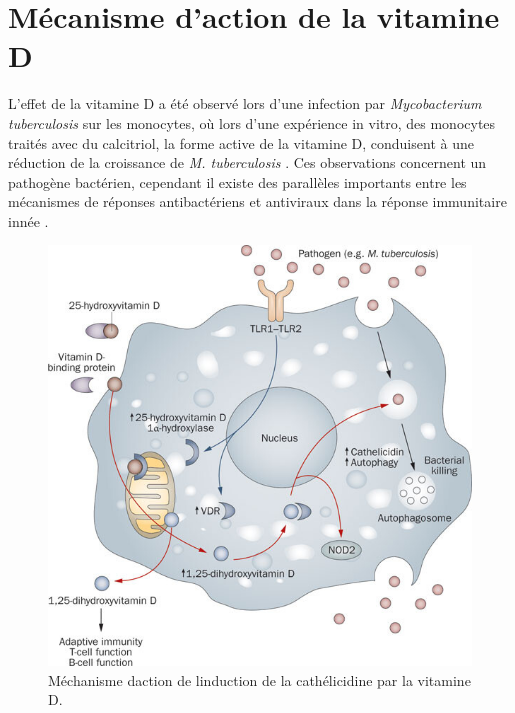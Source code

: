 \documentclass[
  a4paper,
  DIV=11,
  numbers=noendperiod,
  listof=totoc]{scrreprt}
\begin{document}
\hypertarget{muxe9canisme-daction-de-la-vitamine-d}{%
\section{Mécanisme d'action de la vitamine
D}\label{muxe9canisme-daction-de-la-vitamine-d}}

L'effet de la vitamine D a été observé lors d'une infection par
\emph{Mycobacterium tuberculosis} sur les monocytes, où lors d'une
expérience in vitro, des monocytes traités avec du calcitriol, la forme
active de la vitamine D, conduisent à une réduction de la croissance de
\emph{M. tuberculosis} \autocite{Hewison.2011}. Ces observations
concernent un pathogène bactérien, cependant il existe des parallèles
importants entre les mécanismes de réponses antibactériens et antiviraux
dans la réponse immunitaire innée \autocite{White.2022}.

\begin{figure}

{\centering \includegraphics{figures/vd-mecha-cathelicidin.jpg}

}

\caption{Méchanisme d\textquotesingle action de
l\textquotesingle induction de la cathélicidine par la vitamine D.}

\end{figure}
\end{document}
